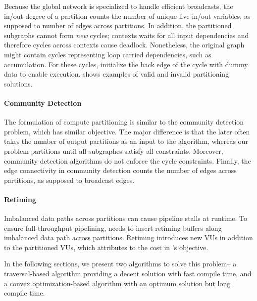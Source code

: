 Because the global network is specialized to handle efficient broadcasts, 
the in/out-degree of a partition counts the number of unique live-in/out variables, as supposed to
number of edges across partitions.
In addition, the partitioned subgraphs cannot form {\em new} cycles; contexts waits for all
input dependencies and therefore cycles across contexts cause deadlock. 
Nonetheless, the original graph might contain cycles representing loop carried dependencies, such as
accumulation. For these cycles, \name initialize the back edge of the cycle with dummy data to
enable execution.
 shows examples of valid and invalid partitioning solutions.

\paragraph{Community Detection}
The formulation of compute partitioning is similar to the community detection problem\cite{community}, which has similar
objective. The major difference is that the later often takes the number of output partitions as an
input to the algorithm, whereas our problem partitions until all subgraphes satisfy all constraints.
Moreover, community detection algorithms do not enforce the cycle constraints. 
Finally, the edge connectivity in community detection counts the number of edges across partitions, as supposed to broadcast edges.

\paragraph{Retiming}
Imbalanced data paths across partitions can cause pipeline stalls at runtime.
To ensure full-throughput pipelining, \name needs to insert retiming buffers along imbalanced data path across
partitions.
Retiming introduces new VUs in addition to the partitioned VUs, which attributes to the cost in
's objective.

In the following sections, we present two algorithms to solve this problem--
a traversal-based algorithm providing a decent solution with fast compile time, and a convex
optimization-based algorithm with an optimum solution but long compile time.


